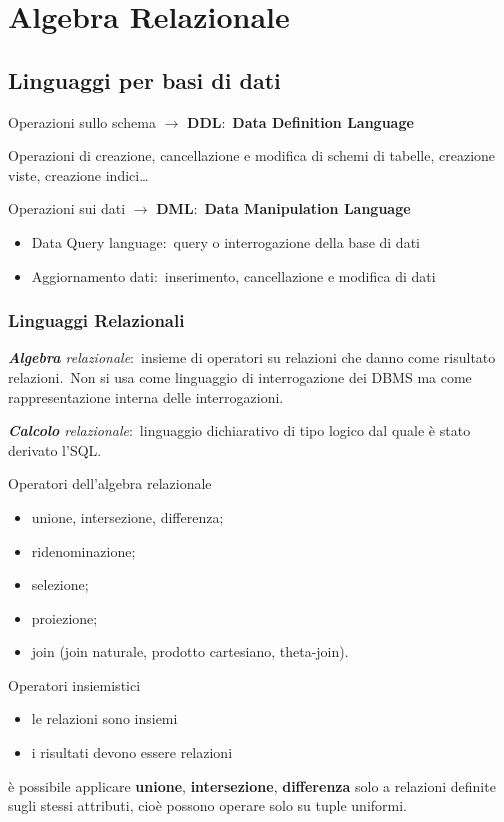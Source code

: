 \chapter{Algebra Relazionale}

\section{Linguaggi per basi di dati}
\begin{center}
	Operazioni sullo schema $\rightarrow$ \textbf{DDL}:\ \textbf{Data Definition Language}
\end{center}

\noindent Operazioni di creazione, cancellazione e modifica di schemi di tabelle, creazione viste, creazione indici\dots

\begin{center}
	Operazioni sui dati $\rightarrow$ \textbf{DML}:\ \textbf{Data Manipulation Language}
\end{center}

\begin{itemize}
	\item Data Query language:\ query o interrogazione della base di dati
	\item Aggiornamento dati:\ inserimento, cancellazione e modifica di dati
\end{itemize}

\subsection{Linguaggi Relazionali}

\textit{\textbf{Algebra} relazionale}:\ insieme di operatori su relazioni che danno come risultato relazioni.\
Non si usa come linguaggio di interrogazione dei DBMS ma come rappresentazione interna delle interrogazioni.

\textit{\textbf{Calcolo} relazionale}:\ linguaggio dichiarativo di tipo logico dal quale è stato derivato l'SQL.

\noindent Operatori dell'algebra relazionale
\begin{itemize}
	\item unione, intersezione, differenza;
	\item ridenominazione;
	\item selezione;
	\item proiezione;
	\item join (join naturale, prodotto cartesiano, theta-join).
\end{itemize}
Operatori insiemistici
\begin{itemize}
	\item le relazioni sono insiemi
	\item i risultati devono essere relazioni
\end{itemize}
è possibile applicare \textbf{unione}, \textbf{intersezione}, \textbf{differenza} solo a relazioni definite sugli stessi attributi, cioè possono operare solo su tuple uniformi.

